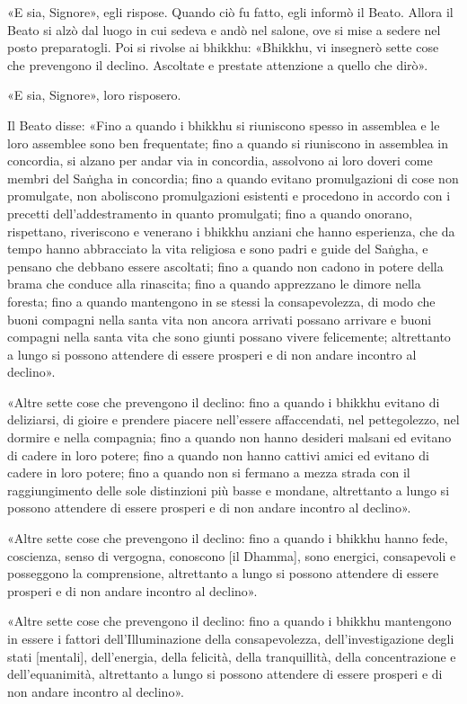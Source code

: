 «E sia, Signore», egli rispose. Quando ciò fu fatto, egli informò il
Beato. Allora il Beato si alzò dal luogo in cui sedeva e andò nel
salone, ove si mise a sedere nel posto preparatogli. Poi si rivolse ai
bhikkhu: «Bhikkhu, vi insegnerò sette cose che prevengono il declino.
Ascoltate e prestate attenzione a quello che dirò».


«E sia, Signore», loro risposero.


Il Beato disse: «Fino a quando i bhikkhu si riuniscono spesso in
assemblea e le loro assemblee sono ben frequentate; fino a quando si
riuniscono in assemblea in concordia, si alzano per andar via in
concordia, assolvono ai loro doveri come membri del Saṅgha in concordia;
fino a quando evitano promulgazioni di cose non promulgate, non
aboliscono promulgazioni esistenti e procedono in accordo con i precetti
dell’addestramento in quanto promulgati; fino a quando onorano,
rispettano, riveriscono e venerano i bhikkhu anziani che hanno
esperienza, che da tempo hanno abbracciato la vita religiosa e sono
padri e guide del Saṅgha, e pensano che debbano essere ascoltati; fino a
quando non cadono in potere della brama che conduce alla rinascita; fino
a quando apprezzano le dimore nella foresta; fino a quando mantengono in
se stessi la consapevolezza, di modo che buoni compagni nella santa vita
non ancora arrivati possano arrivare e buoni compagni nella santa vita
che sono giunti possano vivere felicemente; altrettanto a lungo si
possono attendere di essere prosperi e di non andare incontro al
declino».


«Altre sette cose che prevengono il declino: fino a quando i bhikkhu
evitano di deliziarsi, di gioire e prendere piacere nell’essere
affaccendati, nel pettegolezzo, nel dormire e nella compagnia; fino a
quando non hanno desideri malsani ed evitano di cadere in loro potere;
fino a quando non hanno cattivi amici ed evitano di cadere in loro
potere; fino a quando non si fermano a mezza strada con il
raggiungimento delle sole distinzioni più basse e mondane, altrettanto a
lungo si possono attendere di essere prosperi e di non andare incontro
al declino».


«Altre sette cose che prevengono il declino: fino a quando i bhikkhu
hanno fede, coscienza, senso di vergogna, conoscono [il Dhamma], sono
energici, consapevoli e posseggono la comprensione, altrettanto a lungo
si possono attendere di essere prosperi e di non andare incontro al
declino».


«Altre sette cose che prevengono il declino: fino a quando i bhikkhu
mantengono in essere i fattori dell’Illuminazione della consapevolezza,
dell’investigazione degli stati [mentali], dell’energia, della felicità,
della tranquillità, della concentrazione e dell’equanimità, altrettanto
a lungo si possono attendere di essere prosperi e di non andare incontro
al declino».


